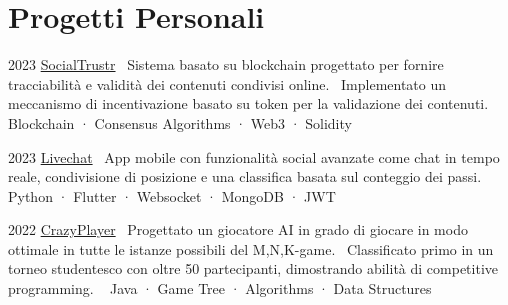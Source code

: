 \documentclass{tccv}
\begin{document}
\section{Progetti Personali}

\begin{yearlist}

\item{2023}
     {\href{https://github.com/manuelarto/socialtrustr}{SocialTrustr}}
     {\textbullet~Sistema basato su blockchain progettato per fornire tracciabilità e validità dei contenuti condivisi online. \newline
     \textbullet~Implementato un meccanismo di incentivazione basato su token per la validazione dei contenuti. \newline
     \textbullet~ Blockchain · Consensus Algorithms · Web3 · Solidity}
\item{2023}
     {\href{https://github.com/manuelarto/livechat}{Livechat}}
     {\textbullet~App mobile con funzionalità social avanzate come chat in tempo reale, condivisione di posizione e una classifica basata sul conteggio dei passi. \newline
    \textbullet~ Python · Flutter · Websocket · MongoDB · JWT}
\item{2022}
     {\href{https://github.com/manuelarto/crazyplayer}{CrazyPlayer}}
     {\textbullet~Progettato un giocatore AI in grado di giocare in modo ottimale in tutte le istanze possibili del M,N,K-game. \newline
     \textbullet~Classificato primo in un torneo studentesco con oltre 50 partecipanti, dimostrando abilità di competitive programming. \newline
    \textbullet~ Java · Game Tree · Algorithms · Data Structures}

\end{yearlist}





\end{document}
